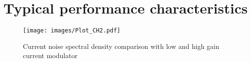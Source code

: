 \newpage
\section{Typical performance characteristics}


\begin{figure}[H]
\centering
\texttt{[image: images/Plot\_CH2.pdf]}
\caption{Current noise spectral density comparison with low and high gain current modulator}
\end{figure}

\newpage